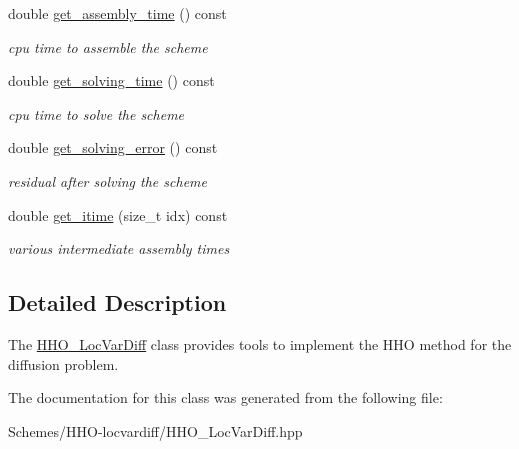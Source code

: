 \begin{DoxyCompactItemize}
double \hyperlink{group__HHO__LocVarDiff_ga9c37d2cf2744465d0bf50ff02fe185f9}{get\+\_\+assembly\+\_\+time} () const
\begin{DoxyCompactList}\small\item\em cpu time to assemble the scheme \end{DoxyCompactList}\item 
double \hyperlink{group__HHO__LocVarDiff_gad184ecd99c5da4172395a210d0289c12}{get\+\_\+solving\+\_\+time} () const
\begin{DoxyCompactList}\small\item\em cpu time to solve the scheme \end{DoxyCompactList}\item 
double \hyperlink{group__HHO__LocVarDiff_ga9648b003ca1d519794bcc5407c8ce606}{get\+\_\+solving\+\_\+error} () const
\begin{DoxyCompactList}\small\item\em residual after solving the scheme \end{DoxyCompactList}\item 
double \hyperlink{group__HHO__LocVarDiff_ga61e65ce589db4203515ae8e1f5c30d0f}{get\+\_\+itime} (size\+\_\+t idx) const
\begin{DoxyCompactList}\small\item\em various intermediate assembly times \end{DoxyCompactList}\end{DoxyCompactItemize}


\subsection{Detailed Description}
The \hyperlink{classHArDCore2D_1_1HHO__LocVarDiff}{H\+H\+O\+\_\+\+Loc\+Var\+Diff} class provides tools to implement the H\+HO method for the diffusion problem. 

The documentation for this class was generated from the following file\+:\begin{DoxyCompactItemize}
\item 
Schemes/\+H\+H\+O-\/locvardiff/H\+H\+O\+\_\+\+Loc\+Var\+Diff.\+hpp\end{DoxyCompactItemize}
